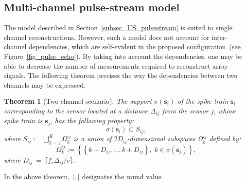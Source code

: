 \documentclass{article}
\newtheorem{theorem}{Theorem}
\newcommand{\vect}[1]{\bm{#1}}
\newcommand{\ser}[2]{#1^{#2}}
\theoremstyle{definition}
\begin{document}
\subsection{Multi-channel pulse-stream model}
\label{subsec_US_multiplechannels}
The model described in Section~\ref{subsec_US_pulsestream} is suited to single channel reconstructions. 
However, such a model does not account for inter-channel dependencies, which are self-evident in the proposed configuration~(see Figure~\ref{fig_pulse_echo}). 
By taking into account the dependencies, one may be able to decrease the number of measurements required to reconstruct array signals.
The following theorem precises the way the dependencies between two channels may be expressed.
\begin{theorem}[Two-channel scenario]
\label{th_2sens_subspace}
The support $\sigma \left(\vect{s}_i\right)$ of the spike train $\vect{s}_i$ corresponding to the sensor located at a distance $\Delta_{ij}$ from the sensor $j$, whose spike train is $\vect{s}_j$, has the following property:
	\begin{equation*}
		\sigma \left(\vect{s}_i\right) \subset S_{ij},
	\end{equation*}
	where $S_{ij} := \bigcup \limits_{k=1}^K \ser{\Omega_k}{ij}$ is a union of $2 D_{ij}$-dimensional subspaces $\ser{\Omega_k}{ij}$ defined by: 
	\begin{equation*}
		\ser{\Omega_k}{ij} := \left \lbrace \left \lbrace k - D_{ij},\dots, k+ D_{ij} \right\rbrace, \; k \in \sigma \left(\vect{s}_{j}\right) \right\rbrace,
	\end{equation*}
	where $D_{ij}~=~\lceil f_s \Delta_{ij}/ c  \rceil$. 
\end{theorem}
In the above theorem, $\lceil.\rceil$ designates the round value.
\end{document}
